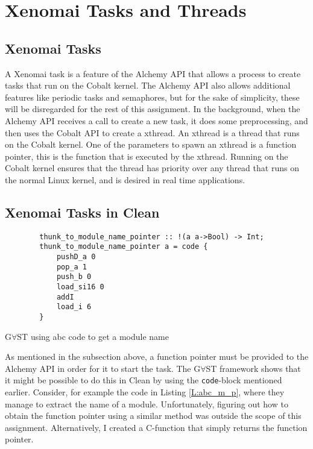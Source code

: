 \documentclass{scrartcl}
\newenvironment{longlisting}{\captionsetup{type=listing}}{}
\begin{document}
\section{Xenomai Tasks and Threads}
\subsection{Xenomai Tasks}
A Xenomai task is a feature of the Alchemy API that allows a process to create tasks that run on the Cobalt kernel.
The Alchemy API also allows additional features like periodic tasks and semaphores, but for the sake of simplicity, these will be disregarded for the rest of this assignment.
In the background, when the Alchemy API receives a call to create a new task, it does some preprocessing, and then uses the Cobalt API to create a xthread.
An xthread is a thread that runs on the Cobalt kernel.
One of the parameters to spawn an xthread is a function pointer, this is the function that is executed by the xthread.
Running on the Cobalt kernel ensures that the thread has priority over any thread that runs on the normal Linux kernel, and is desired in real time applications.

\subsection{Xenomai Tasks in Clean}
\begin{longlisting}
	\begin{verbatim}
		thunk_to_module_name_pointer :: !(a a->Bool) -> Int;
		thunk_to_module_name_pointer a = code {
			pushD_a 0
			pop_a 1
			push_b 0
			load_si16 0
			addI
			load_i 6
		}
	\end{verbatim}
	\caption{G$\forall$ST using abc code to get a module name\label{L:abc_m_p}}
\end{longlisting}
As mentioned in the subsection above, a function pointer must be provided to the Alchemy API in order for it to start the task.
The G$\forall$ST framework shows that it might be possible to do this in Clean by using the \texttt{code}-block mentioned earlier.
Consider, for example the code in Listing \ref{L:abc_m_p}, where they manage to extract the name of a module.
Unfortunately, figuring out how to obtain the function pointer using a similar method was outside the scope of this assignment.
Alternatively, I created a C-function that simply returns the function pointer.
\end{document}
